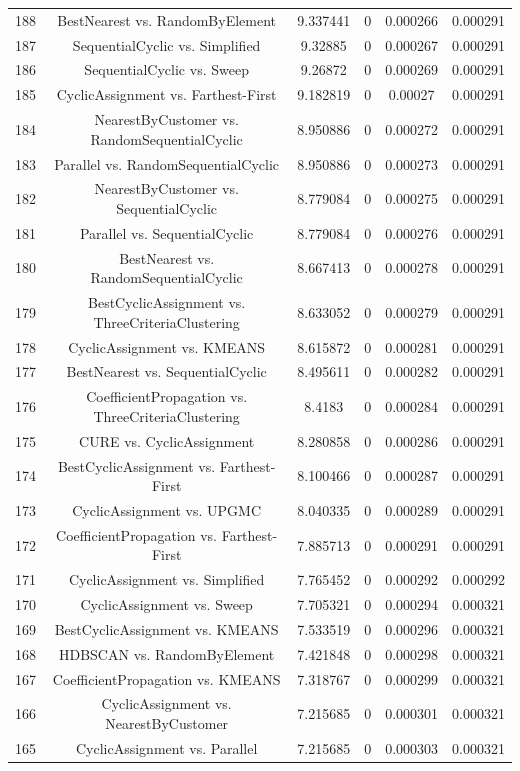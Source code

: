 \documentclass[a4paper,10pt]{article}
\begin{document}
\begin{landscape}
\begin{table}[!htp]
\begin{tabular}{cccccc}
188&BestNearest vs. RandomByElement&9.337441&0&0.000266&0.000291\\
187&SequentialCyclic vs. Simplified&9.32885&0&0.000267&0.000291\\
186&SequentialCyclic vs. Sweep&9.26872&0&0.000269&0.000291\\
185&CyclicAssignment vs. Farthest-First&9.182819&0&0.00027&0.000291\\
184&NearestByCustomer vs. RandomSequentialCyclic&8.950886&0&0.000272&0.000291\\
183&Parallel vs. RandomSequentialCyclic&8.950886&0&0.000273&0.000291\\
182&NearestByCustomer vs. SequentialCyclic&8.779084&0&0.000275&0.000291\\
181&Parallel vs. SequentialCyclic&8.779084&0&0.000276&0.000291\\
180&BestNearest vs. RandomSequentialCyclic&8.667413&0&0.000278&0.000291\\
179&BestCyclicAssignment vs. ThreeCriteriaClustering&8.633052&0&0.000279&0.000291\\
178&CyclicAssignment vs. KMEANS&8.615872&0&0.000281&0.000291\\
177&BestNearest vs. SequentialCyclic&8.495611&0&0.000282&0.000291\\
176&CoefficientPropagation vs. ThreeCriteriaClustering&8.4183&0&0.000284&0.000291\\
175&CURE vs. CyclicAssignment&8.280858&0&0.000286&0.000291\\
174&BestCyclicAssignment vs. Farthest-First&8.100466&0&0.000287&0.000291\\
173&CyclicAssignment vs. UPGMC&8.040335&0&0.000289&0.000291\\
172&CoefficientPropagation vs. Farthest-First&7.885713&0&0.000291&0.000291\\
171&CyclicAssignment vs. Simplified&7.765452&0&0.000292&0.000292\\
170&CyclicAssignment vs. Sweep&7.705321&0&0.000294&0.000321\\
169&BestCyclicAssignment vs. KMEANS&7.533519&0&0.000296&0.000321\\
168&HDBSCAN vs. RandomByElement&7.421848&0&0.000298&0.000321\\
167&CoefficientPropagation vs. KMEANS&7.318767&0&0.000299&0.000321\\
166&CyclicAssignment vs. NearestByCustomer&7.215685&0&0.000301&0.000321\\
165&CyclicAssignment vs. Parallel&7.215685&0&0.000303&0.000321\\

\end{tabular}
\end{table}
\end{landscape}
\end{document}
